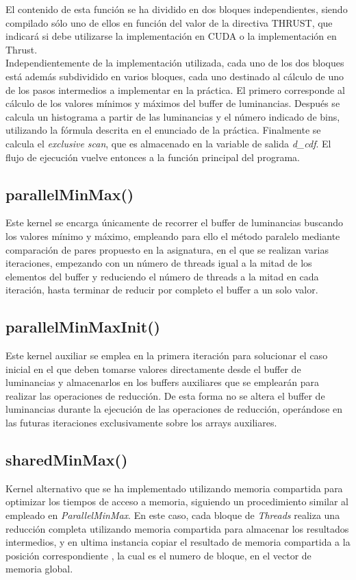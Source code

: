 \documentclass[10pt,oneside,a4paper]{article}
\begin{document}
El contenido de esta función se ha dividido en dos bloques independientes, siendo compilado sólo uno de ellos en función del valor de la directiva THRUST, que indicará si debe utilizarse la implementación en CUDA o la implementación en Thrust.\\

Independientemente de la implementación utilizada, cada uno de los dos bloques está además subdividido en varios bloques, cada uno destinado al cálculo de uno de los pasos intermedios a implementar en la práctica. El primero corresponde al cálculo de los valores mínimos y máximos del buffer de luminancias. Después se calcula un histograma a partir de las luminancias y el número indicado de bins, utilizando la fórmula descrita en el enunciado de la práctica. Finalmente se calcula el \textit{exclusive scan}, que es almacenado en la variable de salida \textit{d\_cdf}. El flujo de ejecución vuelve entonces a la función principal del programa.

\subsection{parallelMinMax()}
Este kernel se encarga únicamente de recorrer el buffer de luminancias buscando los valores mínimo y máximo, empleando para ello el método paralelo mediante comparación de pares propuesto en la asignatura, en el que se realizan varias iteraciones, empezando con un número de threads igual a la mitad de los elementos del buffer y reduciendo el número de threads a la mitad en cada iteración, hasta terminar de reducir por completo el buffer a un solo valor.

\subsection{parallelMinMaxInit()}
Este kernel auxiliar se emplea en la primera iteración para solucionar el caso inicial en el que deben tomarse valores directamente desde el buffer de luminancias y almacenarlos en los buffers auxiliares que se emplearán para realizar las operaciones de reducción. De esta forma no se altera el buffer de luminancias durante la ejecución de las operaciones de reducción, operándose en las futuras iteraciones exclusivamente sobre los arrays auxiliares.

\subsection{sharedMinMax()}
Kernel alternativo que se ha implementado utilizando memoria compartida para optimizar los tiempos de acceso a memoria, siguiendo un procedimiento similar al empleado en \textit{ParallelMinMax}. En este caso, cada bloque de \textit{Threads} realiza una reducción completa utilizando memoria compartida para almacenar los resultados intermedios, y en ultima instancia copiar el resultado de memoria compartida a la posición correspondiente , la cual es el numero de bloque, en el vector de memoria global.\\
\end{document}
